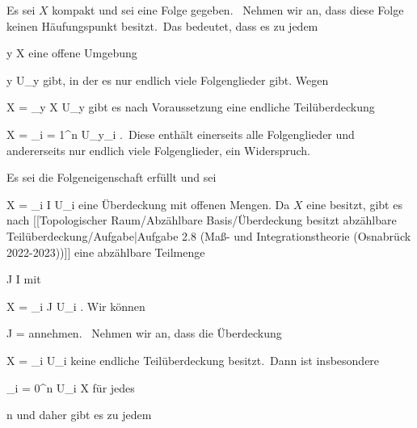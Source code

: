 {

\teilbeweis {}{}{}
{Es sei $X$ kompakt und sei eine Folge
 gegeben.
 Nehmen wir an, dass diese Folge keinen Häufungspunkt besitzt. Das bedeutet, dass es zu jedem

\mavergleichskette
{\vergleichskette
{ y
}
{ \in }{ X
}
{  }{
}
{    }{
}
{   }{
}
}
{}{}{}
eine offene Umgebung

\mavergleichskette
{\vergleichskette
{ y
}
{ \in }{ U_y
}
{  }{
}
{    }{
}
{   }{
}
}
{}{}{}
gibt, in der es nur endlich viele Folgenglieder gibt. Wegen

\mavergleichskettedisp
{\vergleichskette
{ X
}
{ =} { \bigcup_{y \in X} U_y
}
{ } {
}
{ } {
}
{ } {
}
}
{}{}{}
gibt es nach Voraussetzung eine endliche Teilüberdeckung

\mavergleichskettedisp
{\vergleichskette
{ X
}
{ =} { \bigcup_{i = 1}^n U_{y_i }
}
{ } {
}
{ } {
}
{ } {
}
}
{}{}{.} Diese enthält einerseits alle Folgenglieder und andererseits nur endlich viele Folgenglieder, ein Widerspruch.}
{}

\teilbeweis {}{}{}
{Es sei die Folgeneigenschaft erfüllt und sei

\mavergleichskette
{\vergleichskette
{ X
}
{ = }{ \bigcup_{i \in I} U_i
}
{  }{
}
{    }{
}
{   }{
}
}
{}{}{}
eine Überdeckung mit offenen Mengen. Da $X$ eine
besitzt, gibt es nach
[[Topologischer Raum/Abzählbare Basis/Überdeckung besitzt abzählbare Teilüberdeckung/Aufgabe|Aufgabe 2.8 (Maß- und Integrationstheorie (Osnabrück 2022-2023))]]
eine abzählbare Teilmenge

\mavergleichskette
{\vergleichskette
{ J
}
{ \subseteq }{ I
}
{  }{
}
{    }{
}
{   }{
}
}
{}{}{}
mit

\mavergleichskettedisp
{\vergleichskette
{ X
}
{ =} { \bigcup_{i \in J} U_i
}
{ } {
}
{ } {
}
{ } {
}
}
{}{}{.}
Wir können

\mavergleichskette
{\vergleichskette
{ J
}
{ = }{ \N
}
{  }{
}
{    }{
}
{   }{
}
}
{}{}{}
annehmen.  Nehmen wir an, dass die Überdeckung

\mavergleichskette
{\vergleichskette
{ X
}
{ = }{ \bigcup_{i \in \N} U_i
}
{  }{
}
{    }{
}
{   }{
}
}
{}{}{}
keine endliche Teilüberdeckung besitzt. Dann ist insbesondere

\mavergleichskette
{\vergleichskette
{ \bigcup_{i = 0}^n  U_i
}
{ \neq }{ X
}
{  }{
}
{    }{
}
{   }{
}
}
{}{}{}
für jedes

\mavergleichskette
{\vergleichskette
{ n
}
{ \in }{ \N
}
{  }{
}
{    }{
}
{   }{
}
}
{}{}{}
und daher gibt es zu jedem

}}
